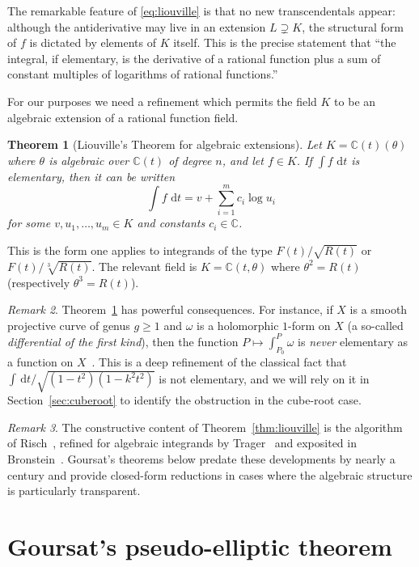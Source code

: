 \documentclass[11pt,a4paper]{article}
\theoremstyle{plain}
\newtheorem{theorem}{Theorem}[section]
\theoremstyle{definition}
\theoremstyle{remark}
\newtheorem{remark}[theorem]{Remark}
\newcommand{\C}{\mathbb{C}}
\renewcommand{\d}{\,\mathrm{d}}
\begin{document}
The remarkable feature of \eqref{eq:liouville} is that no new transcendentals appear: although the antiderivative may live in an extension $L\supsetneq K$, the structural form of $f$ is dictated by elements of $K$ itself. This is the precise statement that ``the integral, if elementary, is the derivative of a rational function plus a sum of constant multiples of logarithms of rational functions.''

For our purposes we need a refinement which permits the field $K$ to be an algebraic extension of a rational function field.

\begin{theorem}[Liouville's Theorem for algebraic extensions]\label{thm:liouville-alg}
Let $K = \C(t)(\theta)$ where $\theta$ is algebraic over $\C(t)$ of degree $n$, and let $f\in K$. If $\int f\,\d t$ is elementary, then it can be written
\[
  \int f\,\d t = v + \sum_{i=1}^m c_i \log u_i
\]
for some $v, u_1,\dots,u_m \in K$ and constants $c_i \in \C$.
\end{theorem}

This is the form one applies to integrands of the type $F(t)/\sqrt{R(t)}$ or $F(t)/\sqrt[3]{R(t)}$. The relevant field is $K = \C(t,\theta)$ where $\theta^2 = R(t)$ (respectively $\theta^3 = R(t)$).

\begin{remark}
Theorem~\ref{thm:liouville-alg} has powerful consequences. For instance, if $X$ is a smooth projective curve of genus $g\geq 1$ and $\omega$ is a holomorphic $1$-form on $X$ (a so-called \emph{differential of the first kind}), then the function $P\mapsto \int_{P_0}^P \omega$ is \emph{never} elementary as a function on $X$~\cite{Bronstein2005}. This is a deep refinement of the classical fact that $\int \d t/\sqrt{(1-t^2)(1-k^2t^2)}$ is not elementary, and we will rely on it in Section~\ref{sec:cuberoot} to identify the obstruction in the cube-root case.
\end{remark}

\begin{remark}
The constructive content of Theorem~\ref{thm:liouville} is the algorithm of Risch~\cite{Risch1969}, refined for algebraic integrands by Trager~\cite{Trager1984} and exposited in Bronstein~\cite{Bronstein2005}. Goursat's theorems below predate these developments by nearly a century and provide closed-form reductions in cases where the algebraic structure is particularly transparent.
\end{remark}


\section{Goursat's pseudo-elliptic theorem}
\label{sec:goursat}
\end{document}
